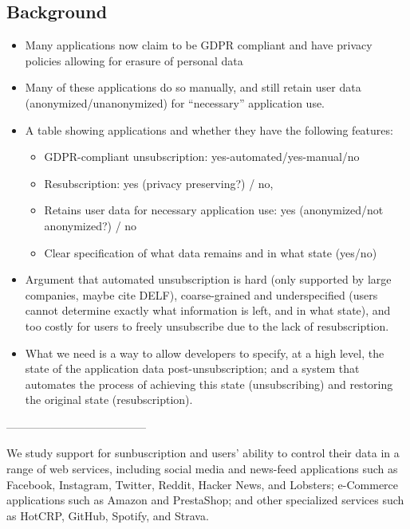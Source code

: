 \subsection{Background}
\begin{itemize}
    \item Many applications now claim to be GDPR compliant and have privacy policies allowing for
    erasure of personal data 
    \item Many of these applications do so manually, and still retain user data
    (anonymized/unanonymized) for ``necessary'' application use.
    \item A table showing applications and whether they have the following features: 
    \begin{itemize}
        \item GDPR-compliant unsubscription: yes-automated/yes-manual/no
        \item Resubscription: yes (privacy preserving?) / no, 
        \item Retains user data for necessary application use: yes (anonymized/not anonymized?) / no
        \item Clear specification of what data remains and in what state (yes/no)
    \end{itemize}
    \item Argument that automated unsubscription is hard (only supported by large companies, maybe
    cite DELF), coarse-grained and underspecified (users cannot determine exactly what information
    is left, and in what state), and too costly for users to freely unsubscribe due to the lack of
    resubscription. 
    \item What we need is a way to allow developers to specify, at a high level, the state of the
    application data post-unsubscription; and a system that automates the process of achieving this
    state (unsubscribing) and restoring the original state (resubscription).
\end{itemize}

--------------------------------------

We study support for sunbuscription and users' ability to control their data in a range of web
services, including social media and news-feed applications such as Facebook, Instagram, Twitter,
Reddit, Hacker News, and Lobsters; e-Commerce applications such as Amazon and PrestaShop; and other
specialized services such as HotCRP, GitHub, Spotify, and Strava.

